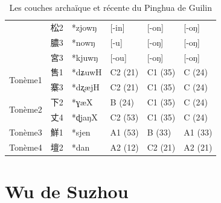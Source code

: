 \documentclass{scrbook}
\newcounter{c}[subsubsection]
\newcommand{\bolang}{\textasciitilde}
\newcommand{\difwenbai}{couches archaïque et récente\xspace}
\newcommand{\diflaoxin}{sociolectes âgé et jeune\xspace}
\newcommand{\iso}{syllabes isolées\xspace}
\newcommand{\exclure}[1]{Il faut d'abord exclure les syllabes #1 avant d'identifier les \difwenbai}
\begin{document}
\begin{sloppypar}
\begin{landscape}
\begin{table}[htbp]
{\begin{tabular}{llllll}
          & 松2    & *zjowŋ & [-in] & [-on] & [-oŋ] \\
          & 膿3    & *nowŋ & [-u]  & [-oŋ] & [-oŋ] \\
          & 宮3    & *kjuwŋ & [-ou] & [-oŋ] & [-oŋ] \\
    \midrule
    \multirow{2}[2]{*}{Tonème1} & 售1    & *dʑuwH & C2 (21) & C1 (35) & C (24) \\
          & 寨3    & *dʐæjH & C2 (21) & C1 (35) & C (24) \\
    \midrule
    \multirow{2}[2]{*}{Tonème2} & 下2    & *ɣæX  & B (24) & C1 (35) & C (24) \\
          & 丈4    & *ɖjaŋX & C2 (53) & C1 (35) & C (24) \\
    \midrule
    Tonème3 & 鮮1    & *sjen & A1 (53) & B (33) & A1 (33) \\
    \midrule
    Tonème4 & 壇2    & *dan  & A2 (12) & C2 (21) & A2 (21) \\
    \bottomrule
    \end{tabular}}%
  \caption{Les \difwenbai du Pinghua de Guilin}
  \label{tab:Guilin1}%
\end{table}%
\end{landscape}


\section{Wu de Suzhou}


\end{sloppypar}
\end{document}
